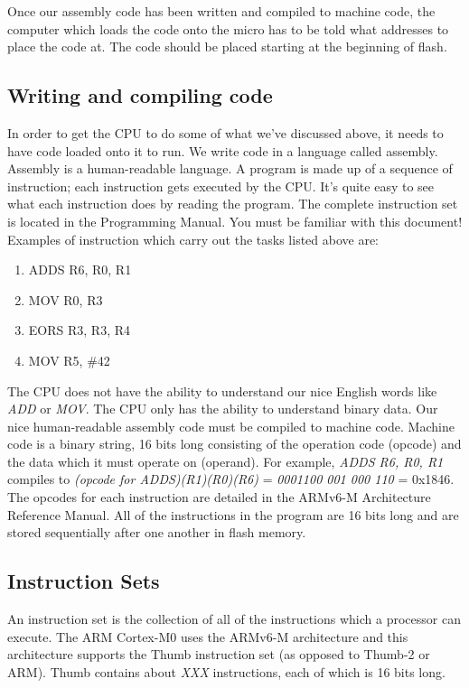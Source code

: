 Once our assembly code has been written and compiled to machine code, the computer which loads the code onto the micro has to be told what addresses to place the code at. The code should be placed starting at the beginning of flash. 

\subsection{Writing and compiling code}
In order to get the CPU to do some of what we've discussed above, it needs to have code loaded onto it to run. We write code in a language called assembly. Assembly is a human-readable language. A program is made up of a sequence of instruction; each instruction gets executed by the CPU. It's quite easy to see what each instruction does by reading the program.  The complete instruction set is located in the Programming Manual. You must be familiar with this document! Examples of instruction which carry out the tasks listed above are:
\begin{enumerate}
  \item ADDS R6, R0, R1
  \item MOV R0, R3
  \item EORS R3, R3, R4
  \item MOV R5, \#42
\end{enumerate}
The CPU does not have the ability to understand our nice English words like \textit{ADD} or \textit{MOV}. The CPU only has the ability to understand binary data. Our nice human-readable assembly code must be compiled to machine code. Machine code is a binary string, 16 bits long consisting of the operation code (opcode) and the data which it must operate on (operand).
For example, \textit{ADDS R6, R0, R1} compiles to \textit{(opcode for ADDS)(R1)(R0)(R6)} = \textit{ 0001100 001 000 110 } = 0x1846.
The opcodes for each instruction are detailed in the ARMv6-M Architecture Reference Manual.
All of the instructions in the program are 16 bits long and are stored sequentially after one another in flash memory. 

\subsection{Instruction Sets}
An instruction set is the collection of all of the instructions which a processor can execute. 
The ARM Cortex-M0 uses the ARMv6-M architecture and this architecture supports the Thumb instruction set (as opposed to Thumb-2 or ARM). 
Thumb contains about \emph{XXX} instructions, each of which is 16 bits long. \\

